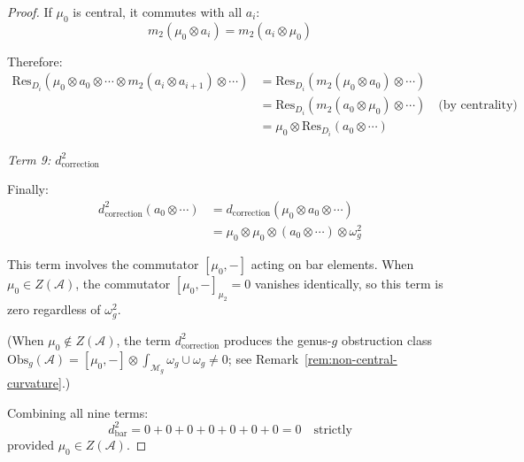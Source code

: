 \begin{proof}
If $\mu_0$ is central, it commutes with all $a_i$:
\[m_2(\mu_0 \otimes a_i) = m_2(a_i \otimes \mu_0)\]

Therefore:
\begin{align}
\text{Res}_{D_i}(\mu_0 \otimes a_0 \otimes \cdots \otimes m_2(a_i \otimes a_{i+1}) \otimes \cdots) 
&= \text{Res}_{D_i}(m_2(\mu_0 \otimes a_0) \otimes \cdots) \\
&= \text{Res}_{D_i}(m_2(a_0 \otimes \mu_0) \otimes \cdots) \quad \text{(by centrality)} \\
&= \mu_0 \otimes \text{Res}_{D_i}(a_0 \otimes \cdots)
\end{align}

\emph{Term 9: $d_{\text{correction}}^2$}

Finally:
\begin{align}
d_{\text{correction}}^2(a_0 \otimes \cdots) 
&= d_{\text{correction}}(\mu_0 \otimes a_0 \otimes \cdots) \\
&= \mu_0 \otimes \mu_0 \otimes (a_0 \otimes \cdots) \otimes \omega_g^2
\end{align}

This term involves the commutator $[\mu_0, -]$ acting on bar elements.  When $\mu_0 \in Z(\mathcal{A})$, the commutator $[\mu_0, -]_{\mu_2} = 0$ vanishes identically, so this term is zero regardless of $\omega_g^2$.

(When $\mu_0 \notin Z(\mathcal{A})$, the term $d_{\mathrm{correction}}^2$ produces the genus-$g$ obstruction class $\mathrm{Obs}_g(\mathcal{A}) = [\mu_0, -] \otimes \int_{\mathcal{M}_g} \omega_g \cup \omega_g \neq 0$; see Remark~\ref{rem:non-central-curvature}.)

Combining all nine terms:
\begin{equation}
d_{\text{bar}}^2 = 0 + 0 + 0 + 0 + 0 + 0 + 0 = 0 \quad \text{strictly}
\end{equation}
provided $\mu_0 \in Z(\mathcal{A})$.

\end{proof}

